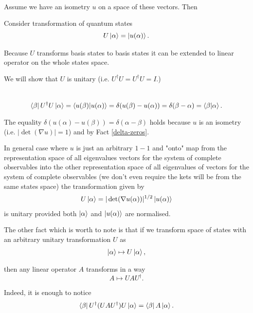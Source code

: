 \documentclass[main.tex]{subfiles}
\begin{document}
Assume we have an isometry $u$ on a space of these vectors. Then 

Consider transformation of quantum states
\begin{equation}
U \ket{\alpha} = \ket{u(\alpha)}.
\end{equation} 

Because $U$ transforms basis states to basis states it can be extended to linear operator on the whole states space.

We will show that $U$ is unitary (i.e. $U^\dag U = U^\dag U = I$.)

\begin{multline*}
\\
\bra{\beta}U^\dag U \ket{\alpha} = \bra{u(\beta)}\ket{u(\alpha)} = \delta(u(\beta) - u(\alpha)) = 
\delta(\beta - \alpha) = \bra{\beta}\ket{\alpha}.\\
\end{multline*} 

The equality $\delta(u(\alpha) - u(\beta)) = \delta(\alpha - \beta)$ holds because $u$ is an isometry (i.e. $|\det (\nabla u)| = 1$) and by Fact \ref{delta-zeros}.

In general case where $u$ is just an arbitrary $1-1$ and "onto" map from the representation space of all eigenvalues vectors for the system of complete observables into the other representation space of all eigenvalues of vectors for the system of complete observables (we don't even require the kets will be from the same states space) the transformation given by
\begin{equation}
U \ket{\alpha} = |\det (\nabla u(\alpha))|^{1/2} \ket{u(\alpha)}
\end{equation} 
is unitary provided both $\ket{\alpha}$ and $\ket{u(\alpha)}$ are normalised.

The other fact which is worth to note is that if we transform space of states with an arbitrary unitary transformation $U$ as
\begin{equation}
\ket{\alpha} \mapsto U\ket{\alpha},
\end{equation} 

then any linear operator $A$ transforms in a way
\begin{equation}
A \mapsto UAU^\dag.
\end{equation}

Indeed, it is enough to notice
\begin{equation}
\bra{\beta}U^\dag(UAU^\dag)U \ket{\alpha} = \bra{\beta} A \ket{\alpha}.
\end{equation}
\end{document}
